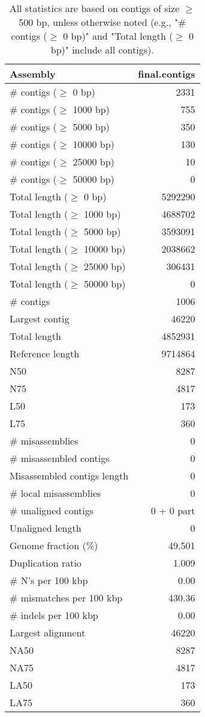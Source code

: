 \documentclass[12pt,a4paper]{article}
\begin{document}
\begin{table}[ht]
\begin{center}
\caption{All statistics are based on contigs of size $\geq$ 500 bp, unless otherwise noted (e.g., "\# contigs ($\geq$ 0 bp)" and "Total length ($\geq$ 0 bp)" include all contigs).}
\begin{tabular}{|l*{1}{|r}|}
\hline
Assembly & final.contigs \\ \hline
\# contigs ($\geq$ 0 bp) & 2331 \\ \hline
\# contigs ($\geq$ 1000 bp) & 755 \\ \hline
\# contigs ($\geq$ 5000 bp) & 350 \\ \hline
\# contigs ($\geq$ 10000 bp) & 130 \\ \hline
\# contigs ($\geq$ 25000 bp) & 10 \\ \hline
\# contigs ($\geq$ 50000 bp) & 0 \\ \hline
Total length ($\geq$ 0 bp) & 5292290 \\ \hline
Total length ($\geq$ 1000 bp) & 4688702 \\ \hline
Total length ($\geq$ 5000 bp) & 3593091 \\ \hline
Total length ($\geq$ 10000 bp) & 2038662 \\ \hline
Total length ($\geq$ 25000 bp) & 306431 \\ \hline
Total length ($\geq$ 50000 bp) & 0 \\ \hline
\# contigs & 1006 \\ \hline
Largest contig & 46220 \\ \hline
Total length & 4852931 \\ \hline
Reference length & 9714864 \\ \hline
N50 & 8287 \\ \hline
N75 & 4817 \\ \hline
L50 & 173 \\ \hline
L75 & 360 \\ \hline
\# misassemblies & 0 \\ \hline
\# misassembled contigs & 0 \\ \hline
Misassembled contigs length & 0 \\ \hline
\# local misassemblies & 0 \\ \hline
\# unaligned contigs & 0 + 0 part \\ \hline
Unaligned length & 0 \\ \hline
Genome fraction (\%) & 49.501 \\ \hline
Duplication ratio & 1.009 \\ \hline
\# N's per 100 kbp & 0.00 \\ \hline
\# mismatches per 100 kbp & 430.36 \\ \hline
\# indels per 100 kbp & 0.00 \\ \hline
Largest alignment & 46220 \\ \hline
NA50 & 8287 \\ \hline
NA75 & 4817 \\ \hline
LA50 & 173 \\ \hline
LA75 & 360 \\ \hline
\end{tabular}
\end{center}
\end{table}
\end{document}
